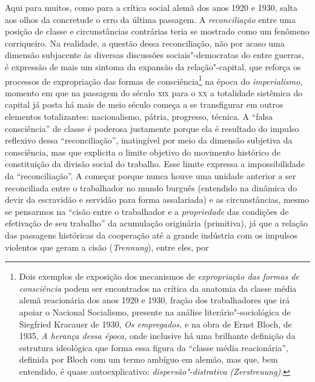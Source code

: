 Aqui para muitos, como para a crítica social alemã dos anos 1920 e 1930,
salta aos olhos da concretude o erro da última passagem. A
\emph{reconciliação} entre uma posição de classe e circunstâncias
contrárias teria se mostrado como um fenômeno corriqueiro. Na realidade,
a questão dessa reconciliação, não por acaso uma dimensão subjacente às
diversas discussões sociais"-democratas do entre guerras, é expressão de
mais um sintoma da expansão da relação"-capital, que reforça os
processos de expropriação das formas de consciência\footnote{Dois
  exemplos de exposição dos mecanismos de \emph{expropriação das formas
  de consciência} podem ser encontrados na crítica da anatomia da classe
  média alemã reacionária dos anos 1920 e 1930, fração dos trabalhadores
  que irá apoiar o Nacional Socialismo, presente na análise
  literário"-sociológica de Siegfried Kracauer de 1930, \emph{Os
  empregados,} e na obra de Ernst Bloch, de 1935, \emph{A herança dessa
  época,} onde inclusive há uma brilhante definição da estrutura
  ideológica que forma essa figura da ``classe média reacionária'',
  definida por Bloch com um termo ambíguo em alemão, mas que, bem
  entendido, é quase autoexplicativo: \emph{dispersão"-distrativa
  (Zerstreuung)}.} na época do \emph{imperialismo}, momento em que na
passagem do século \textsc{xix} para o \textsc{xx} a totalidade
sistêmica do capital já posta há mais de meio século começa a se
transfigurar em outros elementos totalizantes: nacionalismo, pátria,
progresso, técnica. A ``falsa consciência'' de classe é poderosa
justamente porque ela é resultado do impulso reflexivo dessa
``reconciliação'', inatingível por meio da dimensão subjetiva da
consciência, mas que explicita o limite objetivo do movimento histórico
de constituição da divisão social do trabalho. Esse limite expressa a
impossibilidade da ``reconciliação''. A começar porque nunca houve uma
unidade anterior a ser reconciliada entre o trabalhador no mundo burguês
(entendido na dinâmica do devir da escravidão e servidão para forma
assalariada) e as circunstâncias, mesmo se pensarmos na ``cisão entre o %
trabalhador e a \emph{propriedade} das condições de efetivação de seu
trabalho'' da acumulação originária (primitiva), já que a relação das
passagens históricas da cooperação até a grande indústria com os
impulsos violentos que geram a cisão (\emph{Trennung}), entre eles, por %
